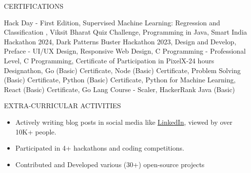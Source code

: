 \documentclass{resume}
\begin{document}

\begin{rSection}{CERTIFICATIONS}

    \begin{itemize}
        Hack Day - First Edition, Supervised Machine Learning: Regression and Classification , Viksit Bharat Quiz Challenge, Programming in Java, Smart India Hackathon 2024, Dark Patterns Buster Hackathon 2023, Design and Develop, Preface - UI/UX Design, Responsive Web Design, C Programming - Professional Level, C Programming, Certificate of Participation in PixelX-24 hours Designathon, Go (Basic) Certificate, Node (Basic) Certificate, Problem Solving (Basic) Certificate, Python (Basic) Certificate, Python for Machine Learning, React (Basic) Certificate, Go Lang Course - Scaler, HackerRank Java (Basic)
    \end{itemize}
    
    \end{rSection}
    


\begin{rSection}{EXTRA-CURRICULAR ACTIVITIES}

    \begin{itemize}
        \item Actively writing blog posts in social media like \href{https://www.linkedin.com/in/rahul-marban}{LinkedIn}, viewed by over 10K+ people.
        \item Participated in 4+ hackathons and coding competitions.
        \item Contributed and Developed various (30+) open-source projects
    \end{itemize}
    
    \end{rSection}
    
    \vspace{1.5em}

    
    
\end{document}
